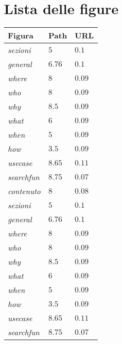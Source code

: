 \section{Lista delle figure}

\begin{longtable}{| p{3cm} | p{5cm} | p{6cm} |}

\hline
\hline
\textbf{Figura} & \textbf{Path} & \textbf{URL} \\ 
\hline
\hline

\textit{sezioni} & $5$ & $0.1$ \\%
\hline
\textit{general} & $6.76$ & $0.1$ \\%
\hline
\textit{where} & $8$ & $0.09$ \\%
\hline
\textit{who} & $8$ & $0.09$ \\%
\hline
\textit{why} & $8.5$ & $0.09$ \\%
\hline
\textit{what} & $6$ & $0.09$ \\%
\hline
\textit{when} & $5$ & $0.09$ \\%
\hline
\textit{how} & $3.5$ & $0.09$ \\%
\hline
\textit{usecase} & $8.65$ & $0.11$ \\%
\hline
\textit{searchfun} & $8.75$ & $0.07$ \\%
\hline
\textit{contenuto} &  $8$ & $0.08$ \\%
\hline
\textit{sezioni} & $5$ & $0.1$ \\%
\hline
\textit{general} & $6.76$ & $0.1$ \\%
\hline
\textit{where} & $8$ & $0.09$ \\%
\hline
\textit{who} & $8$ & $0.09$ \\%
\hline
\textit{why} & $8.5$ & $0.09$ \\%
\hline
\textit{what} & $6$ & $0.09$ \\%
\hline
\textit{when} & $5$ & $0.09$ \\%
\hline
\textit{how} & $3.5$ & $0.09$ \\%
\hline
\textit{usecase} & $8.65$ & $0.11$ \\%
\hline
\textit{searchfun} & $8.75$ & $0.07$ \\%
\hline
\hline
\end{longtable}
